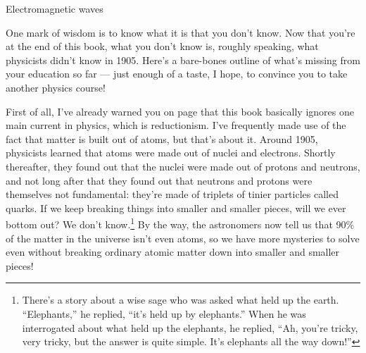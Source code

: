 \begin{envsubsection}{Electromagnetic waves}


\end{envsubsection}
%
One mark of wisdom is to know what it is that you don't know. Now that you're at the end
of this book, what you don't know is, roughly speaking, what physicists didn't know in
1905. Here's a bare-bones outline of what's missing from your education so far --- just
enough of a taste, I hope, to convince you to take another physics course!

First of all, I've already warned you on page \pageref{reductionism} that this book
basically ignores one main current in physics, which is reductionism. I've frequently
made use of the fact that matter is built out of atoms, but that's about it. Around 1905,
physicists learned that atoms were made out of nuclei and electrons. Shortly thereafter,
they found out that the nuclei were made out of protons and neutrons, and not long after that
they found out that neutrons and protons were themselves not fundamental:
they're made of triplets of tinier particles called quarks. If we keep breaking things into smaller
and smaller pieces, will we ever bottom out? We don't know.\footnote{There's a story about a wise sage who was
asked what held up the earth. ``Elephants,'' he replied, ``it's held up by elephants.''
When he was interrogated about what held up the elephants, he replied, ``Ah, you're
tricky, very tricky, but the answer is quite simple. It's elephants all the way down!''}
By the way, the astronomers now tell us that 90\% of the matter in the universe isn't even atoms,
so we have more mysteries to solve even without breaking ordinary atomic matter down into smaller
and smaller pieces!

